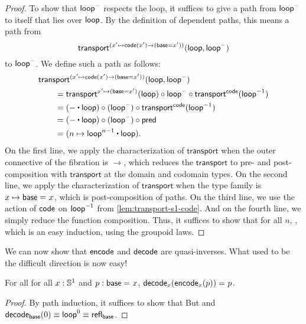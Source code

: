 \begin{proof}
To show that $\mathsf{loop}^{\mathord{\hspace{1pt}\text{--}\hspace{1pt}}}$ respects the loop, it suffices to give a path
from $\mathsf{loop}^{\mathord{\hspace{1pt}\text{--}\hspace{1pt}}}$ to itself that lies over $\mathsf{loop}$. 
By the definition of dependent paths, this means a path from
\[\mathsf{transport}^{(x' \mapsto \mathsf{code}(x') \rightarrow (\mathsf{base}=x'))}(\mathsf{loop},\mathsf{loop}^{\mathord{\hspace{1pt}\text{--}\hspace{1pt}}})\]
to $\mathsf{loop}^{\mathord{\hspace{1pt}\text{--}\hspace{1pt}}}$.  We define such a
path as follows:
\begin{align*}
  \MoveEqLeft \transfib {(x' \mapsto \code(x') \rightarrow (\base=x'))} \lloop {\lloop^{\blank}}\\
&= \transfibf {x'\mapsto (\base=x')}(\lloop) \circ {\lloop^{\blank}} \circ \transfibf \code ({\opp \lloop}) \\
&= (- \ct \lloop) \circ (\lloop^{\blank}) \circ \transfibf \code ({\opp \lloop}) \\
&= (- \ct \lloop) \circ (\lloop^{\blank}) \circ \Zpred \\
&= (n \mapsto \lloop^{n - 1} \ct \lloop).
\end{align*}
On the first line, we apply the characterization of $\mathsf{transport}$
when the outer connective of the fibration is $\rightarrow$, which
reduces the $\mathsf{transport}$ to pre- and post-composition with
$\mathsf{transport}$ at the domain and codomain types.  On the second line,
we apply the characterization of $\mathsf{transport}$ when the type family
is $x\mapsto \mathsf{base} =_{} x$, which is post-composition of paths.  On the third line,
we use the action of $\mathsf{code}$ on $\mathord{{\mathsf{loop}}^{-1}}$ from
\autoref{lem:transport-s1-code}.  And on the fourth line, we simply
reduce the function composition.  Thus, it suffices to show that for all
$n$, , which is an easy
induction, using the groupoid laws.  
\end{proof}

We can now show that $\mathsf{encode}$ and $\mathsf{decode}$ are quasi-inverses.
What used to be the difficult direction is now easy!

\begin{lem} \label{lem:s1-decode-encode}  For all 
for all $x: \mathbb{S} ^1$ and $p : \mathsf{base} =_{} x$, $\mathsf{decode}_x({{\mathsf{encode}_x(p)}}) =_{} p$.  
\end{lem}

\begin{proof}
By path induction, it suffices to show that 
But
and $\mathsf{decode}_{\mathsf{base}}(0) \equiv \mathsf{loop}^ 0 \equiv \mathsf{refl}_{\mathsf{base}}$.  
\end{proof}

